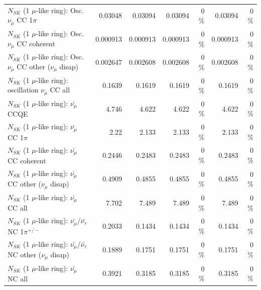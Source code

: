 \begin{table}
\begin{tabular}{| l | r | r | r  r | r  r |}
                          $N_{SK}$ (1 $\mu$-like ring): Osc. $\nu_\mu$ CC 1$\pi$ &         0.03048 &         0.03094 &         0.03094 &        0 \%  &         0.03094 &        0 \%  \\ 
                        $N_{SK}$ (1 $\mu$-like ring): Osc. $\nu_\mu$ CC coherent &        0.000913 &        0.000913 &        0.000913 &        0 \%  &        0.000913 &        0 \%  \\ 
         $N_{SK}$ (1 $\mu$-like ring): Osc. $\nu_\mu$ CC other ($\nu_\mu$ disap) &        0.002647 &        0.002608 &        0.002608 &        0 \%  &        0.002608 &        0 \%  \\ 
                      $N_{SK}$ (1 $\mu$-like ring): oscillation $\nu_\mu$ CC all &          0.1639 &          0.1619 &          0.1619 &        0 \%  &          0.1619 &        0 \%  \\ 
\hline
\hline
                              $N_{SK}$ (1 $\mu$-like ring): $\bar{\nu_\mu}$ CCQE &           4.746 &           4.622 &           4.622 &        0 \%  &           4.622 &        0 \%  \\ 
                         $N_{SK}$ (1 $\mu$-like ring): $\bar{\nu_\mu}$ CC 1$\pi$ &            2.22 &           2.133 &           2.133 &        0 \%  &           2.133 &        0 \%  \\ 
                       $N_{SK}$ (1 $\mu$-like ring): $\bar{\nu_\mu}$ CC coherent &          0.2446 &          0.2483 &          0.2483 &        0 \%  &          0.2483 &        0 \%  \\ 
        $N_{SK}$ (1 $\mu$-like ring): $\bar{\nu_\mu}$ CC other ($\nu_\mu$ disap) &          0.4909 &          0.4855 &          0.4855 &        0 \%  &          0.4855 &        0 \%  \\ 
                          $N_{SK}$ (1 $\mu$-like ring): $\bar{\nu_{\mu}}$ CC all &           7.702 &           7.489 &           7.489 &        0 \%  &           7.489 &        0 \%  \\ 
\hline
  $N_{SK}$ (1 $\mu$-like ring): $\bar{\nu_\mu}$/$\bar{\nu_\tau}$ NC 1$\pi^{+/-}$ &          0.2033 &          0.1434 &          0.1434 &        0 \%  &          0.1434 &        0 \%  \\ 
$N_{SK}$ (1 $\mu$-like ring): $\bar{\nu_\mu}$/$\bar{\nu_\tau}$ NC other ($\nu_\mu$ disap) &          0.1889 &          0.1751 &          0.1751 &        0 \%  &          0.1751 &        0 \%  \\ 
                          $N_{SK}$ (1 $\mu$-like ring): $\bar{\nu_{\mu}}$ NC all &          0.3921 &          0.3185 &          0.3185 &        0 \%  &          0.3185 &        0 \%  \\ 

\end{tabular}
\end{table}
